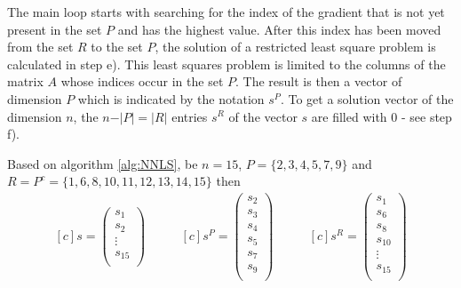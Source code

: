 The main loop starts with searching for the index of the gradient that is not yet present in the set $P$ and has the highest value. After this index has been moved from the set $R$ to the set $P$, the solution of a restricted least square problem is calculated in step e). This least squares problem is limited to the columns of the matrix $A$ whose indices occur in the set $P$. The result is then a vector of dimension $P$ which is indicated by the notation $s^P$. To get a solution vector of the dimension $n$, the $n - \vert P \vert = \vert R \vert$ entries $s^R$ of the vector $s$ are filled with 0 - see step f). 

\begin{example}
	Based on algorithm \ref{alg:NNLS}, be $n = 15$, $P = \{2, 3, 4, 5, 7, 9\}$ and  $R = P^c = \{1, 6, 8, 10, 11, 12, 13, 14, 15\}$ then
	\begin{equation*}
		\begin{aligned}[c]	
		s = 
		\left( 
		\begin{array}{c}
		s_{1} \\
		s_{2} \\
		\vdots\\
		s_{15}\\
		\end{array}
		\right)	
		\end{aligned}
		\qquad
		\begin{aligned}[c]
		s^P = 
		\left( 
		\begin{array}{c}
		s_{2} \\
		s_{3} \\
		s_{4} \\
		s_{5} \\
		s_{7} \\
		s_{9} \\
		\end{array}
		\right)	
		\end{aligned}
		\qquad
		\begin{aligned}[c]
		s^R = 
		\left( 
		\begin{array}{c}
		s_{1} \\
		s_{6} \\
		s_{8} \\
		s_{10} \\
		\vdots \\
		s_{15} \\
		\end{array}
		\right)	
		\end{aligned}	
	\end{equation*}
\end{example}

